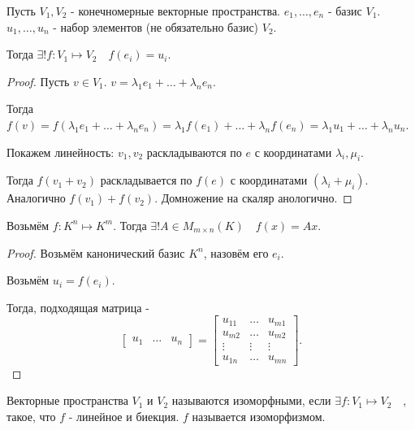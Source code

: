 \begin{theorem} \thmslashn

    Пусть $V_1, V_2$ - конечномерные векторные пространства. $e_1, \ldots, e_{n}$ - базис $V_1$. $u_1, \ldots, u_{n}$ - набор элементов (не обязательно базис) $V_2$.

    Тогда $\exists!{f : V_1 \mapsto V_2}\quad f(e_{i}) = u_{i}$.
    \begin{proof} \thmslashn
    
        Пусть $v\in V_1$. $v = \lambda_1e_1 + \ldots + \lambda_{n}e_{n}$.

        Тогда $f(v) = f(\lambda_1e_1 + \ldots + \lambda_{n}e_{n}) = \lambda_1 f(e_1) + \ldots + \lambda_{n}f(e_{n}) = \lambda_1 u_1 + \ldots + \lambda_{n}u_{n}$.

        Покажем линейность: $v_1, v_2$ раскладываются по $e$ с координатами $\lambda_{i}, \mu_{i}$.

        Тогда $f(v_1 + v_2)$ раскладывается по $f(e)$ с координатами $(\lambda_{i} + \mu_{i})$. Аналогично $f(v_1) + f(v_2)$. Домножение на скаляр анологично.
    \end{proof}
\end{theorem}
\begin{consequence} \thmslashn

    Возьмём $f : K^{n} \mapsto K^{m}$. Тогда $\exists!{A\in M_{m \times n}(K)}\quad f(x) = Ax$.
    \begin{proof} \thmslashn
    
        Возьмём канонический базис $K^{n}$, назовём его $e_{i}$.

        Возьмём $u_{i} = f(e_{i})$.

        Тогда, подходящая матрица - 
        \[ \begin{bmatrix} u_1 & \ldots & u_{n} \end{bmatrix} = 
            \begin{bmatrix} 
                u_{11} & \ldots & u_{m1}\\ 
                u_{m2} & \ldots & u_{m2}\\
                \vdots & \vdots & \vdots\\
                u_{1n} & \ldots & u_{mn}
            \end{bmatrix}   .\] 
    \end{proof}
\end{consequence}
\begin{definition} \thmslashn 

    Векторные пространства $V_1$ и $V_2$ называются изоморфными, если $\exists{f : V_1 \mapsto V_2}\quad $, такое, что $f$ - линейное и биекция. $f$ называется изоморфизмом.
\end{definition}
